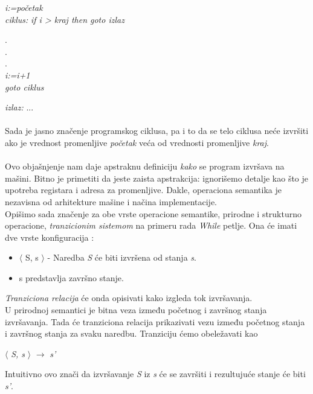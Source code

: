 \documentclass[a4paper]{article}
\begin{document}
{\hspace{4cm} \textit{i:=početak}\\
\textit{ciklus:} \hspace{3cm} \textit{if i > kraj then goto izlaz}
\begin{center}
.
\\.
\\.
\\ \textit{i:=i+1}
\\ \textit{goto ciklus}
\end{center}
\textit{izlaz:} \hspace{4cm} ...\\
\\Sada je jasno značenje programskog ciklusa, pa i to da se telo ciklusa neće izvršiti ako je vrednost promenljive \textit{početak} veća od vrednosti promenljive \textit{kraj}.\\
\\Ovo objašnjenje nam daje apstraknu definiciju \textit{kako} se program izvršava na mašini. Bitno je primetiti da jeste zaista apstrakcija: ignorišemo detalje kao što je upotreba registara i adresa za promenljive. Dakle, operaciona semantika je nezavisna od arhitekture mašine i načina implementacije.\\

Opišimo sada značenje za obe vrste operacione semantike, prirodne i strukturno operacione, \textit{tranzicionim sistemom} na primeru rada \emph{While} petlje. Ona će imati dve vrste konfiguracija \cite{wiley}:
\begin{itemize}
	\item $\langle$ S, s $\rangle$ - Naredba \textit{S} će biti izvršena od stanja \textit{s}.
	\item s predstavlja završno stanje.
\end{itemize}
\textit{Tranziciona relacija} će onda opisivati kako izgleda tok izvršavanja. \\

U prirodnoj semantici je bitna veza između početnog i završnog stanja izvršavanja. Tada će tranziciona relacija prikazivati vezu između početnog stanja i završnog stanja za svaku naredbu. Tranziciju ćemo obeležavati kao

\begin{center}$\langle$ \textit{S, s} $\rangle$ $\rightarrow$ \textit{s'} \end{center}
Intuitivno ovo znači da izvršavanje \textit{S} iz \textit{s} će se završiti i rezultujuće stanje će biti \textit{s'}.

}
\end{document}
